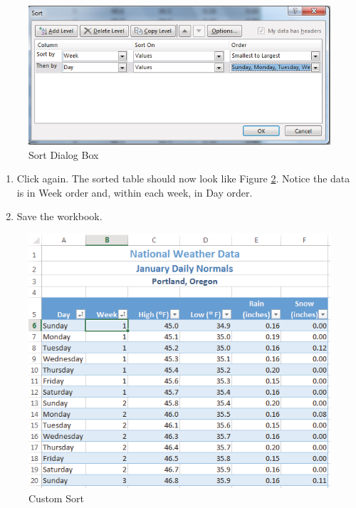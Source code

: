 \begin{figure}[H]
	\centering
	\includegraphics[width=\maxwidth{.95\linewidth}]{gfx/ch05_fig14}
	\caption{Sort Dialog Box}
	\label{05:fig14}
\end{figure}

\begin{enumerate}
	\item Click  again. The sorted table should now look like Figure \ref{05:fig15}. Notice the data is in Week order and, within each week, in Day order.
	\item Save the workbook.
\end{enumerate}

\begin{figure}[H]
	\centering
	\includegraphics[width=\maxwidth{.95\linewidth}]{gfx/ch05_fig15}
	\caption{Custom Sort}
	\label{05:fig15}
\end{figure}

